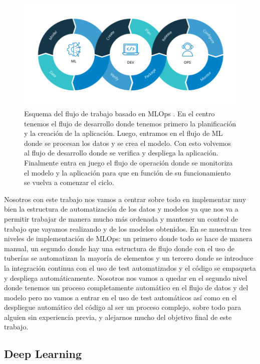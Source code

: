 \documentclass[a4paper,12pt,twoside,titlepage]{article}
\begin{document}
\begin{figure}[h!]
  \centering
  \includegraphics[scale=0.50]{mlops.PNG}
  \caption{Esquema del flujo de trabajo basado en MLOps \cite{mlops_neal}. En el centro tenemos el flujo de desarrollo donde tenemos primero la planificación y la creación de la aplicación. Luego, entramos en el flujo de ML donde se procesan los datos y se crea el modelo. Con esto volvemos al flujo de desarrollo donde se verifica y despliega la aplicación. Finalmente entra en juego el flujo de operación donde se monitoriza el modelo y la aplicación para que en función de su funcionamiento se vuelva a comenzar el ciclo.}
  \label{fig:mlops}
\end{figure}

Nosotros con este trabajo nos vamos a centrar sobre todo en implementar muy bien la estructura de automatización de los datos y modelos ya que nos va a permitir trabajar de manera mucho más ordenada y mantener un control de trabajo que vayamos realizando y de los modelos obtenidos. En \cite{mlops_begin} se muestran tres niveles de implementación de MLOps: un primero donde todo se hace de manera manual, un segundo donde hay una estructura de flujo donde con el uso de tuberías se automatizan la mayoría de elementos y un tercero donde se introduce la integración continua con el uso de test automatizados y el código se empaqueta y despliega automáticamente. Nosotros nos vamos a quedar en el segundo nivel donde tenemos un proceso completamente automático en el flujo de datos y del modelo pero no vamos a entrar en el uso de test automáticos así como en el despliegue automático del código al ser un proceso complejo, sobre todo para alguien sin experiencia previa, y alejarnos mucho del objetivo final de este trabajo. 

\subsection{Deep Learning}
\label{sec:dl}
\end{document}
